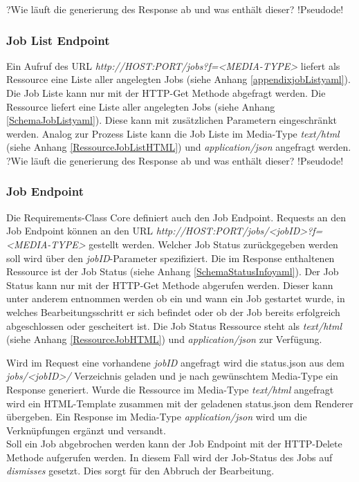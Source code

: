 ?Wie läuft die generierung des Response ab und was enthält dieser?
!Pseudode!

\subsubsection{Job List Endpoint}
Ein Aufruf des URL \textit{http://HOST:PORT/jobs?f=<MEDIA-TYPE>} liefert als Ressource eine Liste aller angelegten Jobs (siehe Anhang \ref{appendixjobListyaml}). 
Die Job Liste kann nur mit der HTTP-Get Methode abgefragt werden. Die Ressource liefert eine Liste aller angelegten Jobs (siehe Anhang \ref{SchemaJobListyaml}). 
Diese kann mit zusätzlichen Parametern eingeschränkt werden. Analog zur Prozess Liste kann die Job Liste im Media-Type \textit{text/html} (siehe Anhang \ref{RessourceJobListHTML})
und \textit{application/json} angefragt werden. 
?Wie läuft die generierung des Response ab und was enthält dieser?
!Pseudode!

\subsubsection{Job Endpoint}
Die Requirements-Class Core definiert auch den Job Endpoint.
Requests an den Job Endpoint können an den URL \textit{http://HOST:PORT/jobs/<jobID>?f=<MEDIA-TYPE>} gestellt werden. 
Welcher Job Status zurückgegeben werden soll wird über den \textit{jobID}-Parameter spezifiziert. 
Die im Response enthaltenen Ressource ist der Job Status (siehe Anhang \ref{SchemaStatusInfoyaml}). Der Job Status kann nur mit der HTTP-Get Methode abgerufen werden. 
Dieser kann unter anderem entnommen werden ob ein und wann ein Job gestartet wurde, in welches Bearbeitungsschritt er sich befindet oder ob der Job bereits 
erfolgreich abgeschlossen oder gescheitert ist. 
Die Job Status Ressource steht als \textit{text/html} (siehe Anhang \ref{RessourceJobHTML}) und \textit{application/json} zur Verfügung. 

Wird im Request eine vorhandene \textit{jobID} angefragt wird die status.json aus dem \textit{jobs/<jobID>/} Verzeichnis geladen und je nach gewünschtem Media-Type 
ein Response generiert. Wurde die Ressource im Media-Type \textit{text/html} angefragt wird ein HTML-Template zusammen mit der geladenen status.json 
dem Renderer übergeben.
Ein Response im Media-Type \textit{application/json} wird um die Verknüpfungen ergänzt und versandt. \\

Soll ein Job abgebrochen werden kann der Job Endpoint mit der HTTP-Delete Methode aufgerufen werden. In diesem Fall wird der Job-Status des Jobs auf \textit{dismisses} 
gesetzt. Dies sorgt für den Abbruch der Bearbeitung. 

